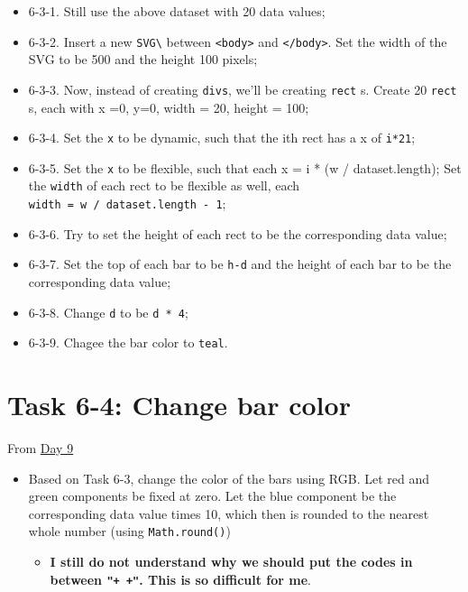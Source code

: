 \documentclass[
]{book}
\providecommand{\tightlist}{%
  \setlength{\itemsep}{0pt}\setlength{\parskip}{0pt}}
\begin{document}
\begin{itemize}
\item
  6-3-1. Still use the above dataset with 20 data values;
\item
  6-3-2. Insert a new \texttt{SVG\textbackslash{}} between \texttt{\textless{}body\textgreater{}} and \texttt{\textless{}/body\textgreater{}}. Set the width of the SVG to be 500 and the height 100 pixels;
\item
  6-3-3. Now, instead of creating \texttt{divs}, we'll be creating \texttt{rect} s. Create 20 \texttt{rect} s, each with x =0, y=0, width = 20, height = 100;
\item
  6-3-4. Set the \texttt{x} to be dynamic, such that the ith rect has a x of \texttt{i*21};
\item
  6-3-5. Set the \texttt{x} to be flexible, such that each x = i * (w / dataset.length); Set the \texttt{width} of each rect to be flexible as well, each \texttt{width\ =\ w\ /\ dataset.length\ -\ 1};
\item
  6-3-6. Try to set the height of each rect to be the corresponding data value;
\item
  6-3-7. Set the top of each bar to be \texttt{h-d} and the height of each bar to be the corresponding data value;
\item
  6-3-8. Change \texttt{d} to be \texttt{d\ *\ 4};
\item
  6-3-9. Chagee the bar color to \texttt{teal}.
\end{itemize}

\hypertarget{task-6-4-change-bar-color}{%
\section{Task 6-4: Change bar color}\label{task-6-4-change-bar-color}}

From \href{https://observablehq.com/@hongtaoh/day-nine-spet-2-2020}{Day 9}

\begin{itemize}
\item
  Based on Task 6-3, change the color of the bars using RGB. Let red and green components be fixed at zero. Let the blue component be the corresponding data value times 10, which then is rounded to the nearest whole number (using \texttt{Math.round()})

  \begin{itemize}
  \tightlist
  \item
    \textbf{I still do not understand why we should put the codes in between \texttt{"+\ +"}. This is so difficult for me}.
  \end{itemize}
\end{itemize}
\end{document}
